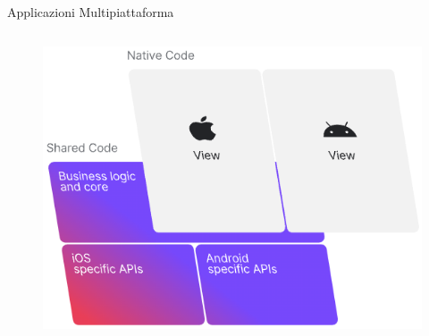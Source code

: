\begin{frame}{Applicazioni Multipiattaforma}
\begin{columns}[onlytextwidth]
\begin{column}{0.5\textwidth}
             \begin{figure}[H]
                \includegraphics[width=1\textwidth]{img/kmm-stack-official.png}
            \end{figure}
            
        \end{column}
    \end{columns}
\end{frame}


